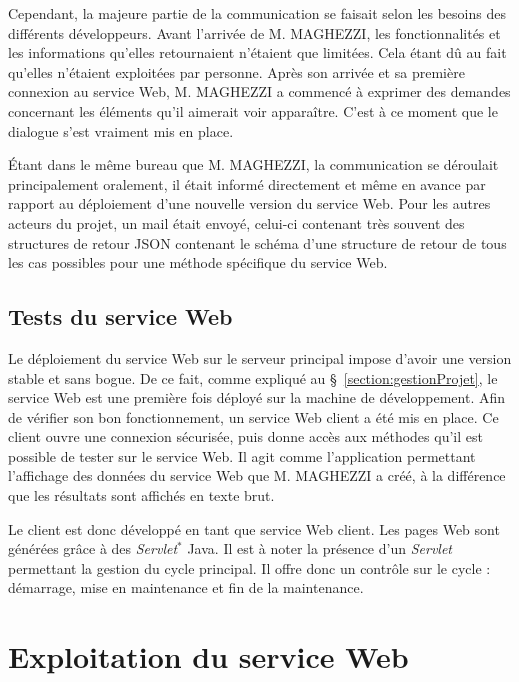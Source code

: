Cependant, la majeure partie de la communication se faisait selon les besoins des diff\'erents d\'eveloppeurs.
Avant l'arriv\'ee de M. MAGHEZZI, les fonctionnalit\'es et les informations qu'elles retournaient n'\'etaient que limit\'ees.
Cela \'etant d\^u au fait qu'elles n'\'etaient exploit\'ees par personne.
Apr\`es son arriv\'ee et sa premi\`ere connexion au service Web, M. MAGHEZZI a commenc\'e \`a exprimer des demandes concernant les \'el\'ements qu'il aimerait voir appara\^itre.
C'est \`a ce moment que le dialogue s'est vraiment mis en place.

\'Etant dans le m\^eme bureau que M. MAGHEZZI, la communication se d\'eroulait principalement oralement, il \'etait inform\'e directement et m\^eme en avance par rapport au d\'eploiement d'une nouvelle version du service Web.
Pour les autres acteurs du projet, un mail \'etait envoy\'e, celui-ci contenant tr\`es souvent des structures de retour JSON contenant le sch\'ema d'une structure de retour de tous les cas possibles pour une m\'ethode sp\'ecifique du service Web.

\subsection{Tests du service Web}

Le d\'eploiement du service Web sur le serveur principal impose d'avoir une version stable et sans bogue.
De ce fait, comme expliqu\'e au \S~\ref{section:gestionProjet}, le service Web est une premi\`ere fois d\'eploy\'e sur la machine de d\'eveloppement.
Afin de v\'erifier son bon fonctionnement, un service Web client a \'et\'e mis en place.
Ce client ouvre une connexion s\'ecuris\'ee, puis donne acc\`es aux m\'ethodes qu'il est possible de tester sur le service Web.
Il agit comme l'application permettant l'affichage des donn\'ees du service Web que M. MAGHEZZI a cr\'e\'e, \`a la diff\'erence que les r\'esultats sont affich\'es en texte brut.

Le client est donc d\'evelopp\'e en tant que service Web client.
Les pages Web sont g\'en\'er\'ees gr\^ace \`a des \textit{Servlet}$^*$ Java.
Il est \`a noter la pr\'esence d'un \textit{Servlet} permettant la gestion du cycle principal.
Il offre donc un contr\^ole sur le cycle : d\'emarrage, mise en maintenance et fin de la maintenance.


\section{Exploitation du service Web}

